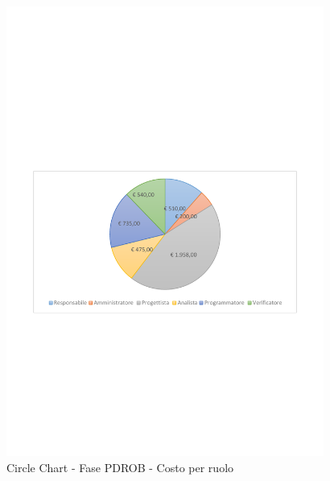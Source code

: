 \documentclass[../PianoProgetto.tex]{subfiles}
\begin{document}
	\begin{figure}[!h]
		\centering
		\includegraphics[width=0.93\textwidth , trim=2cm 9.5cm 2cm 11cm]{grafici/PDROB/PDROB-costo}
			\caption{Circle Chart - Fase PDROB - Costo per ruolo}
		\label{fig:CircleChart-fasePDROB_costo}
	\end{figure}
\vfill	
\end{document}
